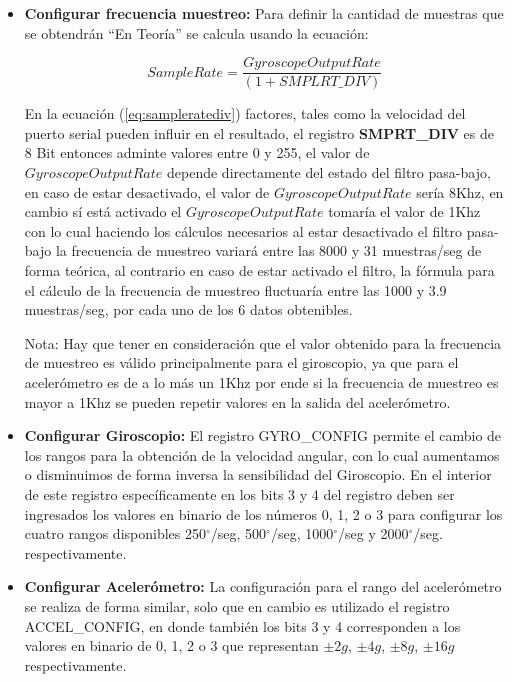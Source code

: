 \documentclass[12pt,a4paper]{article}
\newcommand{\grad}{$^{\circ}$}
\begin{document}
\begin{itemize}
	\item \textbf{Configurar frecuencia muestreo:} Para definir la cantidad de muestras que se obtendrán ``En Teoría'' se calcula usando la ecuación: 
	
	\begin{equation} 
	\label{eq:sampleratediv}
	Sample Rate = \frac{Gyroscope Output Rate}{(1 + SMPLRT\_DIV) }
	\end{equation}
	
	En la ecuación (\ref{eq:sampleratediv}) factores, tales como la velocidad del puerto serial pueden influir en el resultado, el registro \textbf{SMPRT\_DIV} es de 8 Bit entonces adminte valores entre 0 y 255, el valor de $Gyroscope Output Rate$ depende directamente del estado del filtro pasa-bajo, en caso de estar desactivado, el valor de $Gyroscope Output Rate$ sería 8Khz, en cambio sí está activado el $Gyroscope Output Rate$ tomaría el valor de 1Khz con lo cual haciendo los cálculos necesarios al estar desactivado el filtro pasa-bajo la frecuencia de muestreo variará entre las 8000 y 31 muestras/seg de forma teórica, al contrario en caso de estar activado el filtro, la fórmula para el cálculo de la frecuencia de muestreo fluctuaría entre las 1000 y 3.9 muestras/seg, por cada uno de los 6 datos obtenibles.
	
	Nota: Hay que tener en consideración que el valor obtenido para la frecuencia de muestreo es válido principalmente para el giroscopio, ya que para el acelerómetro es de a lo más un 1Khz por ende si la frecuencia de muestreo es mayor a 1Khz se pueden repetir valores en la salida del acelerómetro.
	
	\item \textbf{Configurar Giroscopio:} El registro GYRO\_CONFIG permite el cambio de los rangos para la obtención de la velocidad angular, con lo cual aumentamos o disminuimos de forma inversa la sensibilidad del Giroscopio. En el interior de este registro específicamente en los bits 3 y 4 del registro deben ser ingresados los valores en binario de los números 0, 1, 2 o 3 para configurar los cuatro rangos disponibles 250\grad/seg, 500\grad/seg, 1000\grad/seg y 2000\grad/seg. respectivamente.
	
	\item \textbf{Configurar Acelerómetro:} La configuración para el rango del acelerómetro se realiza de forma similar, solo que en cambio es utilizado el registro ACCEL\_CONFIG, en donde también los bits 3 y 4 corresponden a los valores en binario de 0, 1, 2 o 3 que representan $\pm 2g$, $\pm 4g$, $\pm 8g$, $\pm 16g$ respectivamente.
	
\end{itemize}
\end{document}
